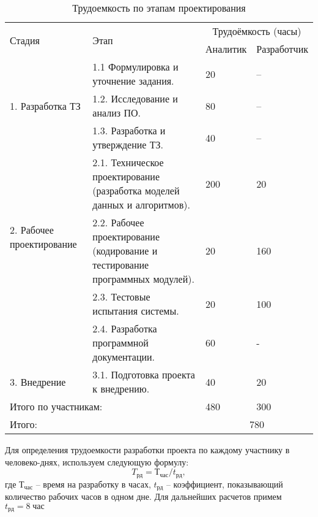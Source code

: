 \begin{table}[htb]
	\caption{Трудоемкость по этапам проектирования}\label{tab:b}
    \centering
        \begin{tabular}{|p{4cm}|p{5.5cm}|l|l|}
        		\hline
        		\multirow{2}{4cm}{Стадия} & \multirow{2}{*}{Этап} & \multicolumn{2}{c|}{Трудоёмкость (часы)} \\
        		\cline{3-4}
            	& & Аналитик & Разработчик \\
            	\hline	
            	\multirow{3}{*}{1. Разработка ТЗ} 
            						& 1.1 Формулировка и уточнение задания. 
            						& 20 & – \\
            	\cline{2-4}	
                					& 1.2. Исследование и анализ ПО. 
            						& 80 & – \\
            	\cline{2-4}	
            	    					& 1.3. Разработка и утверждение ТЗ. 
            						& 40 & – \\
            	\hline	
            	\multirow{3}{4cm}{2. Рабочее
проектирование
} 
            						& 2.1. Техническое проектирование (разработка моделей данных и алгоритмов).
            						& 200 & 20 \\
            	\cline{2-4}	
                					& 2.2. Рабочее проектирование (кодирование и тестирование программных модулей). 
            						& 20 & 160 \\
            	\cline{2-4}	
            	    					& 2.3. Тестовые испытания системы. 
            						& 20 & 100 \\
            	\cline{2-4}	
            	    					& 2.4. Разработка программной документации.
            						& 60 & - \\						
        		\hline
        		3. Внедрение & 3.1. Подготовка проекта к внедрению. & 40 & 20 \\
        		\hline
        		\multicolumn{2}{|l|}{Итого по участникам:} & 480 & 300 \\
        		\hline
        		\multicolumn{2}{|l|}{Итого:} & \multicolumn{2}{c|}{ 780 } \\
        		\hline
        \end{tabular}   		
\end{table}

Для определения трудоемкости разработки проекта по каждому участнику в человеко-днях, используем следующую формулу: 
$$ T_{рд} = Т_{час}/t_{рд},$$
где $Т_{час}$ – время на разработку в часах, $t_{рд}$ – коэффициент, показывающий количество рабочих часов в одном дне. Для дальнейших расчетов примем $t_{рд} = 8\; час$

